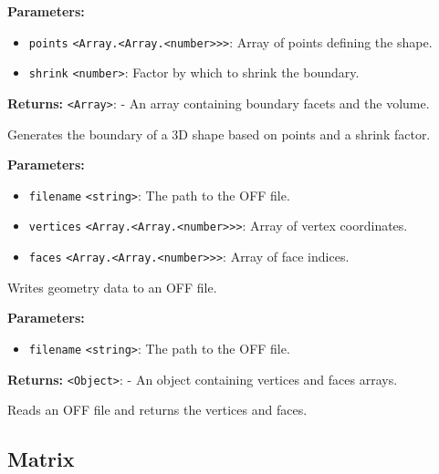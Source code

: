 \documentclass[12pt,a4paper]{article}
\begin{document}
\noindent \textbf{Parameters:}
\begin{itemize}
  \item \texttt{points} \texttt{<Array.<Array.<number>>>}: Array of points defining the shape.
  \item \texttt{shrink} \texttt{<number>}: Factor by which to shrink the boundary.
\end{itemize}

\noindent \textbf{Returns:} \texttt{<Array>}: - An array containing boundary facets and the volume.

\noindent Generates the boundary of a 3D shape based on points and a shrink factor.

\vspace{5mm}
\noindent {}


\noindent \textbf{Parameters:}
\begin{itemize}
  \item \texttt{filename} \texttt{<string>}: The path to the OFF file.
  \item \texttt{vertices} \texttt{<Array.<Array.<number>>>}: Array of vertex coordinates.
  \item \texttt{faces} \texttt{<Array.<Array.<number>>>}: Array of face indices.
\end{itemize}

\noindent Writes geometry data to an OFF file.

\vspace{5mm}
\noindent {}


\noindent \textbf{Parameters:}
\begin{itemize}
  \item \texttt{filename} \texttt{<string>}: The path to the OFF file.
\end{itemize}

\noindent \textbf{Returns:} \texttt{<Object>}: - An object containing vertices and faces arrays.

\noindent Reads an OFF file and returns the vertices and faces.


\subsection{Matrix}
\vspace{5mm}
\noindent {}
\end{document}
